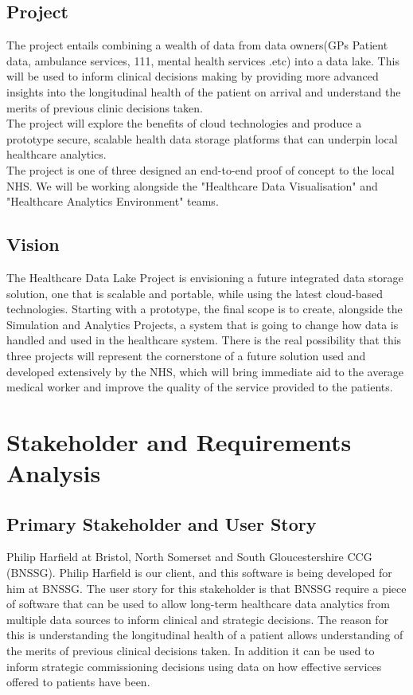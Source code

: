 \documentclass[10pt]{article}
\begin{document}
\subsection{Project}
\label{sec:project}
The project entails combining a wealth of data from data owners(GPs Patient data, ambulance services, 111, mental health services .etc) into a data lake. This will be used to inform clinical decisions making by providing more advanced insights into the longitudinal health of the patient on arrival and understand the merits of previous clinic decisions taken.
\\
The project will explore the benefits of cloud technologies and produce a prototype secure, scalable health data storage platforms that can underpin local healthcare analytics.
\\
The project is one of three designed an end-to-end proof of concept to the local NHS. We will be working alongside the "Healthcare Data Visualisation" and "Healthcare Analytics Environment" teams. 
\subsection{Vision}
The Healthcare Data Lake Project is envisioning a future integrated data storage solution, one that is scalable and portable, while using the latest cloud-based technologies. Starting with a prototype, the final scope is to create, alongside the Simulation and Analytics Projects, a system that is going to change how data is handled and used in the healthcare system. There is the real possibility that this three projects will represent the cornerstone of a future solution used and developed extensively by the NHS, which will bring immediate aid to the average medical worker and improve the quality of the service provided to the patients.



\section{Stakeholder and Requirements
Analysis}\label{stakeholder-and-requirements-analysis}

\subsection{Primary Stakeholder and User
Story}\label{primary-stakeholder-and-user-story}

Philip Harfield at Bristol, North Somerset and South Gloucestershire CCG
(BNSSG). Philip Harfield is our client, and this software is being
developed for him at BNSSG. The user story for this stakeholder is that
BNSSG require a piece of software that can be used to allow long-term
healthcare data analytics from multiple data sources to inform clinical
and strategic decisions. The reason for this is understanding the
longitudinal health of a patient allows understanding of the merits of
previous clinical decisions taken. In addition it can be used to inform
strategic commissioning decisions using data on how effective services
offered to patients have been.
\end{document}

